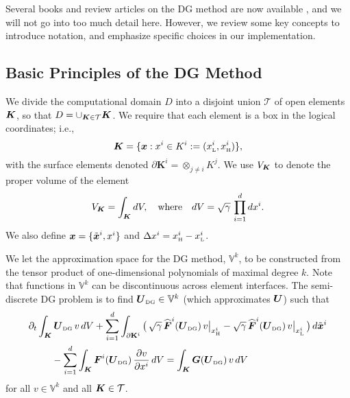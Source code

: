 \documentclass[10pt,preprint]{aastex}
\newcommand{\dx}{\Delta x}
\newcommand{\pbK}{\partial\mathbf{K}}
\newcommand{\sumx}{\sum_{i=1}^{d}}
\begin{document}
Several books and review articles on the DG method are now available \citep[see, e.g.,][]{cockburnShu_2001,hesthavenWarburton_2008}, and we will not go into too much detail here.  
However, we review some key concepts to introduce notation, and emphasize specific choices in our implementation.  

\subsection{Basic Principles of the DG Method}

We divide the computational domain $D$ into a disjoint union $\mathcal{T}$ of open elements $\boldsymbol{K}$, so that $D = \cup_{\boldsymbol{K} \in \mathcal{T}}\boldsymbol{K}$.  
We require that each element is a box in the logical coordinates; i.e.,
\begin{equation}
  \boldsymbol{K}=\{\boldsymbol{x} : x^{i} \in K^{i} := (x_{\mbox{\tiny L}}^{i},x_{\mbox{\tiny H}}^{i})\}, 
\end{equation}
with the surface elements denoted $\pbK^{i}=\otimes_{j\ne i}K^{j}$.  
We use $V_{\boldsymbol{K}}$ to denote the proper volume of the element
\begin{equation}
  V_{\boldsymbol{K}} = \int_{\boldsymbol{K}}dV, \quad\text{where}\quad dV = \sqrt{\gamma}\,\prod_{i=1}^{d}dx^{i}.  
\end{equation}
We also define $\boldsymbol{x}=\{\tilde{\boldsymbol{x}}^{i},x^{i}\}$ and $\dx^{i}=\xH^{i}-\xL^{i}$.  

We let the approximation space for the DG method, $\mathbb{V}^{k}$, to be constructed from the tensor product of one-dimensional polynomials of maximal degree $k$.  
Note that functions in $\mathbb{V}^{k}$ can be discontinuous across element interfaces.  
The semi-discrete DG problem is to find $\boldsymbol{U}_{\mbox{\tiny DG}}\in\mathbb{V}^{k}$ (which approximates $\boldsymbol{U}$) such that
\begin{align}
  &\partial_{t}\int_{\bK}\bU_{\DG}\,v\,dV
  +\sumx\int_{\pbK^{i}}\big(\,\sqrt{\gamma}\,\widehat{\vect{F}}^{i}(\bU_{\DG})\,v\big|_{\xH^{i}}-\sqrt{\gamma}\,\widehat{\vect{F}}^{i}(\bU_{\DG})\,v\big|_{\xL^{i}}\,\big)\,d\tilde{\bx}^{i} \nonumber \\
  &\hspace{24pt}
  -\sumx\int_{\bK}\vect{F}^{i}(\bU_{\DG})\,\pderiv{v}{x^{i}}\,dV
  =\int_{\bK}\bG(\bU_{\DG})\,v\,dV
  \label{eq:semidiscreteDG}
\end{align}
for all $v\in\mathbb{V}^{k}$ and all $\boldsymbol{K}\in\mathcal{T}$.  
\end{document}
